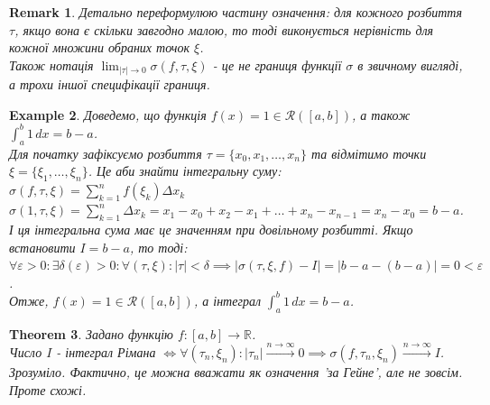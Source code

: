 \documentclass[a4paper, 10pt]{article}
\def\huge{\displaystyle}
\theoremstyle{theoremdd}
\newtheorem{theorem}{Theorem}[subsection]
\theoremstyle{theoremdd}
\theoremstyle{theoremdd}
\theoremstyle{theoremdd}
\theoremstyle{theoremdd}
\newtheorem{example}[theorem]{Example}
\theoremstyle{theoremdd}
\theoremstyle{theoremdd}
\newtheorem{remark}[theorem]{Remark}
\theoremstyle{theoremdd}
\theoremstyle{theoremdd}
\begin{document}
\begin{remark}
Детально переформулюю частину означення: для кожного розбиття $\tau$, якщо вона є скільки завгодно малою, то тоді виконується нерівність для кожної множини обраних точок $\xi$.\\
Також нотація $\huge\lim_{|\tau| \to 0} \sigma(f,\tau,\xi)$ - це не границя функції $\sigma$ в звичному вигляді, а трохи іншої специфікації границя.
\end{remark}

\begin{example}
Доведемо, що функція $f(x) = 1 \in \mathcal{R}([a,b])$, а також $\huge \int_a^b 1\,dx = b-a$.\\
Для початку зафіксуємо розбиття $\tau = \{x_0,x_1,\dots,x_n\}$ та відмітимо точки $\xi = \{\xi_1,\dots,\xi_n\}$. Це аби знайти інтегральну суму:\\
$\sigma (f, \tau, \xi) = \huge \sum_{k=1}^n f(\xi_k) \Delta x_k$\\
$\sigma (1, \tau, \xi) = \huge \sum_{k=1}^n \Delta x_k = x_1 - x_0 + x_2 - x_1 + \dots + x_n - x_{n-1} = x_n - x_0 = b - a$.\\
І ця інтегральна сума має це значенням при довільному розбитті. Якщо встановити $I = b -a$, то тоді:\\
$\forall \varepsilon > 0: \exists \delta(\varepsilon) > 0: \forall (\tau, \xi): |\tau| < \delta \implies |\sigma (\tau, \xi, f) - I| = |b-a - (b-a)| = 0 < \varepsilon$.\\
Отже, $f(x) = 1 \in \mathcal{R}([a,b])$, а інтеграл $\huge \int_a^b 1\,dx = b-a$.
\end{example}

\begin{theorem}
Задано функцію $f: [a,b] \to \mathbb{R}$.\\
Число $I$ - інтеграл Рімана $\iff \forall (\tau_n, \xi_n): |\tau_n| \overset{n \to \infty}{\longrightarrow} 0 \implies \sigma(f, \tau_n, \xi_n) \overset{n \to \infty}{\longrightarrow} I$.\\
\textit{Зрозуміло. Фактично, це можна вважати як означення 'за Гейне', але не зовсім. Проте схожі.}
\end{theorem}
\end{document}
